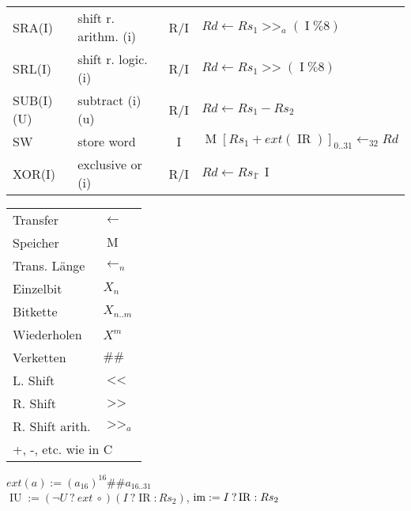\documentclass[8pt,a4paper]{article}
\newcommand{\imm}{\operatorname{IR}}
\newcommand{\mem}{\operatorname{M}}
\newcommand{\ls}{\operatorname{<<}}
\newcommand{\rs}{\operatorname{>>}}
\newcommand{\rsa}{\operatorname{>>}_a}
\newcommand{\concat}{\#\#}
\newcommand{\iu}{\operatorname{IU}}
\newcommand{\imme}{\operatorname{I}}
\begin{document}
\begin{multicols}{2}
\begin{tabular}{llcl}
SRA(I)          & shift r. arithm. (i) & R/I & $Rd \leftarrow Rs_1 \rsa (\imme\% 8)$                     \\
SRL(I)          & shift r. logic. (i)  & R/I & $Rd \leftarrow Rs_1 \rs (\imme\% 8)$                      \\
SUB(I)(U)       & subtract (i) (u)     & R/I & $Rd \leftarrow Rs_1 - Rs_2$                               \\
SW              & store word           & I   & $\mem[Rs_1 + ext(\imm)]_{0..31} \leftarrow_{32}Rd$        \\
XOR(I)          & exclusive or (i)     & R/I & $Rd \leftarrow Rs_1 \hat{\:} \imme$                       \\
\end{tabular}

\begin{tabular}{ll}
Transfer        & $\leftarrow$   \\
Speicher        & $\mem$         \\
Trans. Länge    & $\leftarrow_n$ \\
Einzelbit       & $X_n$          \\
Bitkette        & $X_{n..m}$     \\
Wiederholen     & $X^m$          \\
Verketten       & $\concat$      \\
L. Shift        & $\ls$          \\
R. Shift        & $\rs$          \\
R. Shift arith.	& $\rsa$         \\
\multicolumn{2}{l}{+, -, etc. wie in C}
\end{tabular}

$ext(a) := (a_{16})^{16} \concat a_{16..31} $                                              \\
$\iu := (\neg U \: ? \: ext \: \circ) (I \: ? \imm : Rs_2) $, $\im := I \: ? \imm : Rs_2 $ \\


\end{multicols}
\end{document}
